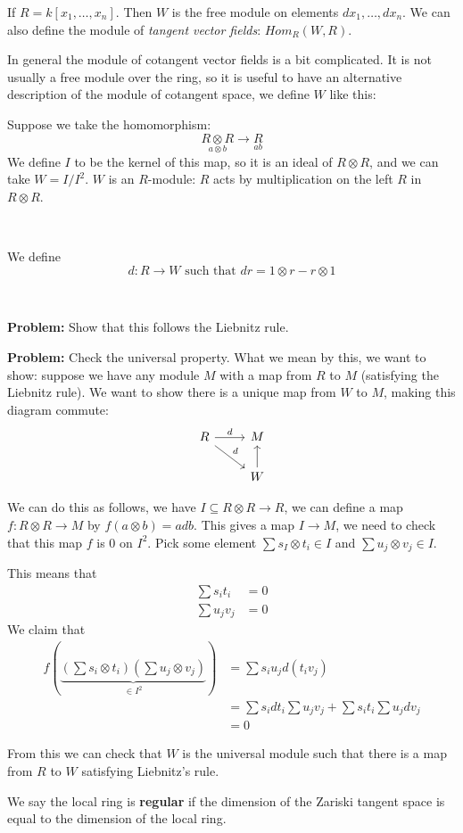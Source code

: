 \begin{example}
    If $R = k[x_1,\ldots,x_n]$. Then $W$ is the free module on elements $dx_1,\ldots,dx_n$.
    We can also define the module of \textit{tangent vector fields}: $Hom_R(W,R)$.
\end{example}

In general the module of cotangent vector fields is a bit complicated. It is not usually a free module over the ring, so it is useful to have an alternative description of the module of cotangent space, we define $W$ like this:\begin{definition}
    Suppose we take the homomorphism: \[\underset{a\otimes b}{R\otimes R}\rightarrow \underset{ab}{R}\]
We define $I$ to be the kernel of this map, so it is an ideal of $R\otimes R$, and we can take $W = I/I^2$.
$W$ is an $R$-module: $R$ acts by multiplication on the left $R$ in $R\otimes R$. 

\

We define \[d\colon R\rightarrow W \text{ such that }dr = 1\otimes r - r\otimes 1\]

\

\textbf{Problem:} Show that this follows the Liebnitz rule.

\textbf{Problem:} Check the universal property. What we mean by this, we want to show: suppose we have any module $M$ with a map from $R$ to $M$ (satisfying the Liebnitz rule). We want to show there is a unique map from $W$ to $M$, making this diagram commute:
\[\begin{tikzcd}
    R \arrow{r}{d} \arrow{dr}{d} & M \\%
    & W \arrow{u}
    \end{tikzcd}
    \]

We can do this as follows, we have $I\subseteq R\otimes R\rightarrow R$, we can define a map $f\colon R\otimes R\rightarrow M$ by $f(a\otimes b) = adb$.
This gives a map $I\rightarrow M$, we need to check that this map $f$ is $0$ on $I^2$. Pick some element $\sum s_I\otimes t_i\in I$ and $\sum u_j\otimes v_j\in I$.

This means that \begin{align*}
    \sum s_i t_i &= 0\\
    \sum u_j v_j &= 0
\end{align*}
We claim that \begin{align*}
    f(\underbrace{(\sum s_i\otimes t_i)(\sum u_j\otimes v_j)}_{\in I^2}) &= \sum s_i u_j d (t_i v_j)\\
    &=\sum s_i dt_i \sum u_j v_j + \sum s_i t_i \sum u_j dv_j\\
    &= 0 
\end{align*}

From this we can check that $W$ is the universal module such that there is a map from $R$ to $W$ satisfying Liebnitz's rule.
\end{definition}
We say the local ring is \textbf{regular} if the dimension of the Zariski tangent space is equal to the dimension of the local ring.


